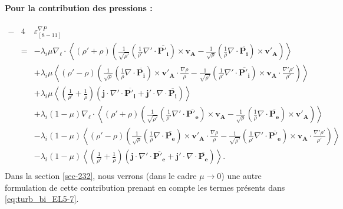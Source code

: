 \paragraph{Pour la contribution des pressions :} 
\begin{eqnarray}
  \label{eq:turb_bin_TEMP} - &4&  \varepsilon^{\nabla P}_{[8-11]} \nonumber\\
  &=&- \lambda_i\mu \nabla_{\boldsymbol{\ell}} \cdot \left< \left(\rho' + \rho\right) \left(\frac{1}{\sqrt{\rho'}}\left(\frac{1}{\rho'}\nabla' \cdot \overline{\boldsymbol{P'_i}}\right)\times \boldsymbol{v_A} - \frac{1}{\sqrt{\rho}} \left(\frac{1}{\rho}\nabla \cdot \overline{\boldsymbol{P_i}}\right)\times \boldsymbol{v'_A}\right)\right> \nonumber\\ 
  &&+\lambda_i\mu  \left<\left(\rho' - \rho\right) \left(\frac{1}{\sqrt{\rho}}\left( \frac{1}{\rho}\nabla \cdot \overline{\boldsymbol{P_i}}\right)\times \boldsymbol{v'_A} \cdot \frac{\nabla  \rho }{\rho}-\frac{1}{\sqrt{\rho'}}\left(\frac{1}{\rho'}\nabla' \cdot \overline{\boldsymbol{P'_i}} \right)\times \boldsymbol{v_A} \cdot \frac{\nabla'  \rho' }{\rho'}\right)\right> \nonumber\\
  &&+\lambda_i\mu \left< \left(\frac{1}{\rho'} + \frac{1}{\rho}\right)  \left(\boldsymbol{j} \cdot\nabla' \cdot \overline{\boldsymbol{P'_i}}+ \boldsymbol{j'} \cdot  \nabla \cdot \overline{\boldsymbol{P_i}}\right)\right> \nonumber\\
    &&+\lambda_i \left(1-\mu\right) \nabla_{\boldsymbol{\ell}} \cdot \left< \left(\rho' + \rho\right) \left(\frac{1}{\sqrt{\rho'}}\left(\frac{1}{\rho'}\nabla' \cdot \overline{\boldsymbol{P'_e}}\right)\times \boldsymbol{v_A} - \frac{1}{\sqrt{\rho}}\left(\frac{1}{\rho}\nabla \cdot \overline{\boldsymbol{P_e}}\right)\times \boldsymbol{v'_A}\right)\right> \nonumber\\ 
  &&-\lambda_i \left(1-\mu\right) \left<\left(\rho' - \rho\right) \left(\frac{1}{\sqrt{\rho}}\left(\frac{1}{\rho}\nabla \cdot \overline{\boldsymbol{P_e}}\right)\times \boldsymbol{v'_A} \cdot \frac{\nabla  \rho }{\rho}-\frac{1}{\sqrt{\rho'}}\left(\frac{1}{\rho'} \nabla' \cdot \overline{\boldsymbol{P'_e}}\right)\times \boldsymbol{v_A} \cdot \frac{\nabla'  \rho' }{\rho'}\right)\right> \nonumber\\
  &&-\lambda_i \left(1-\mu\right) \left< \left(\frac{1}{\rho'} + \frac{1}{\rho}\right) \left(\boldsymbol{j} \cdot \nabla' \cdot \overline{\boldsymbol{P'_e}} + \boldsymbol{j'} \cdot \nabla \cdot \overline{\boldsymbol{P_e}}\right) \right>. \nonumber\\
\end{eqnarray}
Dans la section \ref{sec-232}, nous verrons (dans le cadre $\mu \rightarrow 0$) une autre formulation de cette contribution prenant en compte les termes présents dans \eqref{eq:turb_bi_EL5-7}. 
